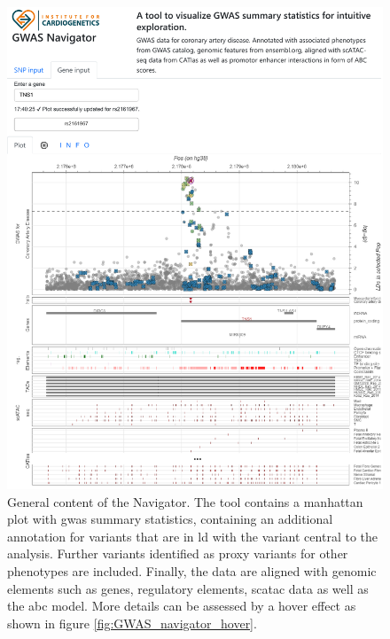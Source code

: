     \begin{figure}[H]
        \vspace*{-0.5cm}
        \capstart
        \centering
        \includegraphics{Abbildung/GWAS_navigator_screenshot.pdf}

        \begin{minipage}{\captionwidth}
            \caption[database]{\newline
            General content of the  Navigator. The tool contains a manhattan plot with \ac{gwas} summary statistics, containing an additional annotation for variants that are in \ac{ld} with the variant central to the analysis. Further variants identified as proxy variants for other phenotypes are included. Finally, the data are aligned with genomic elements such as genes, regulatory elements, \ac{sc}\ac{atac} data as well as the \ac{abc} model. More details can be assessed by a hover effect as shown in figure \ref{fig:GWAS_navigator_hover}.}
            \label{fig:navigator}
        \end{minipage}
    \end{figure}


